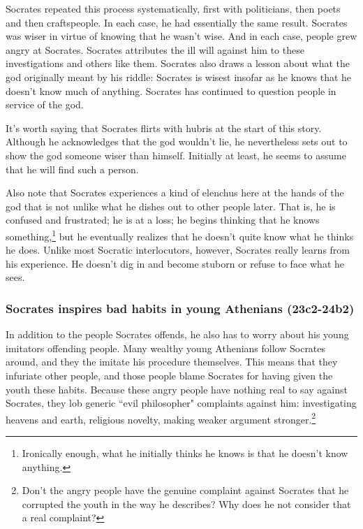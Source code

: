 \documentclass[11pt]{article}
\begin{document}
Socrates repeated this process systematically, first with politicians, then poets and then craftspeople.  In each case, he had essentially the same result.  Socrates was wiser in virtue of knowing that he wasn't wise.  And in each case, people grew angry at Socrates.  Socrates attributes the ill will against him to these investigations and others like them.  Socrates also draws a lesson about what the god originally meant by his riddle: Socrates is wisest insofar as he knows that he doesn't know much of anything.  Socrates has continued to question people in service of the god.

It's worth saying that Socrates flirts with hubris at the start of this story.  Although he acknowledges that the god wouldn't lie, he nevertheless sets out to show the god someone wiser than himself.  Initially at least, he seems to assume that he will find such a person.

Also note that Socrates experiences a kind of elenchus here at the hands of the god that is not unlike what he dishes out to other people later. That is, he is confused and frustrated; he is at a loss; he begins thinking that he knows something,\footnote{Ironically enough, what he initially thinks he knows is that he doesn't know anything.} but he eventually realizes that he doesn't quite know what he thinks he does.  Unlike most Socratic interlocutors, however, Socrates really learns from his experience.  He doesn't dig in and become stuborn or refuse to face what he sees.

\subsubsection{Socrates inspires bad habits in young Athenians (23c2-24b2)}

In addition to the people Socrates offends, he also has to worry about his young imitators offending people.  Many wealthy young Athenians follow Socrates around, and they the imitate his procedure themselves. This means that they infuriate other people, and those people blame Socrates for having given the youth these habits.  Because these angry people have nothing real to say against Socrates, they lob generic ``evil philosopher" complaints against him: investigating heavens and earth, religious novelty, making weaker argument stronger.\footnote{Don't the angry people have the genuine complaint against Socrates that he corrupted the youth in the way he describes? Why does he not consider that a real complaint?}
\end{document}
